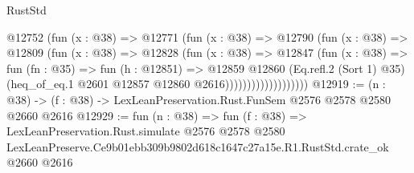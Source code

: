 \begin{lexlean}{RustStd}
\begin{coremodule}
                          @12752
                            (fun (x : @38) =>
                            @12771
                              (fun (x : @38) =>
                              @12790
                                (fun (x : @38) =>
                                @12809
                                  (fun (x : @38) =>
                                  @12828
                                    (fun (x : @38) =>
                                    @12847
                                      (fun (x : @38) =>
                                      fun (fn : @35) =>
                                      fun (h : @12851) =>
                                      @12859
                                        @12860
                                        (Eq.refl.{2} (Sort 1) @35)
                                        (heq_of_eq.{1} @2601 @12857 @12860 @2616)))))))))))))))))))
@12919 := (n : @38) -> (f : @38) -> LexLeanPreservation.Rust.FunSem @2576 @2578 @2580 @2660 @2616
@12929 := fun (n : @38) =>
  fun (f : @38) =>
  LexLeanPreservation.Rust.simulate
    @2576
    @2578
    @2580
    LexLeanPreserve.Ce9b01ebb309b9802d618c1647c27a15e.R1.RustStd.crate_ok
    @2660
    @2616
\end{coremodule}
\end{lexlean}
